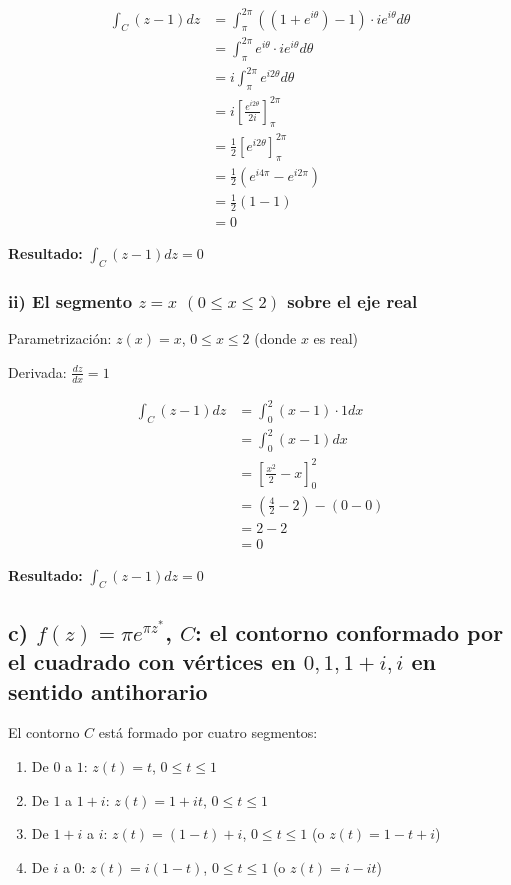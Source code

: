 \documentclass{article}
\begin{document}
\begin{align*}
\int_C (z - 1) dz &= \int_{\pi}^{2\pi} ((1 + e^{i\theta}) - 1) \cdot ie^{i\theta} d\theta \\
                  &= \int_{\pi}^{2\pi} e^{i\theta} \cdot ie^{i\theta} d\theta \\
                  &= i \int_{\pi}^{2\pi} e^{i2\theta} d\theta \\
                  &= i \left[\frac{e^{i2\theta}}{2i}\right]_{\pi}^{2\pi} \\
                  &= \frac{1}{2} \left[e^{i2\theta}\right]_{\pi}^{2\pi} \\
                  &= \frac{1}{2} (e^{i4\pi} - e^{i2\pi}) \\
                  &= \frac{1}{2} (1 - 1) \\
                  &= 0
\end{align*}

\textbf{Resultado:} $\int_C (z - 1) dz = 0$

\subsubsection*{ii) El segmento $z = x$ $(0 \leq x \leq 2)$ sobre el eje real}

Parametrización: $z(x) = x$, $0 \leq x \leq 2$ (donde $x$ es real)

Derivada: $\frac{dz}{dx} = 1$

\begin{align*}
\int_C (z - 1) dz &= \int_0^2 (x - 1) \cdot 1 dx \\
                  &= \int_0^2 (x - 1) dx \\
                  &= \left[\frac{x^2}{2} - x\right]_0^2 \\
                  &= \left(\frac{4}{2} - 2\right) - (0 - 0) \\
                  &= 2 - 2 \\
                  &= 0
\end{align*}

\textbf{Resultado:} $\int_C (z - 1) dz = 0$

\subsection*{c) $f(z) = \pi e^{\pi z^*}$, $C$: el contorno conformado por el cuadrado con vértices en $0, 1, 1 + i, i$ en sentido antihorario}

El contorno $C$ está formado por cuatro segmentos:
\begin{enumerate}
\item De $0$ a $1$: $z(t) = t$, $0 \leq t \leq 1$
\item De $1$ a $1 + i$: $z(t) = 1 + it$, $0 \leq t \leq 1$
\item De $1 + i$ a $i$: $z(t) = (1 - t) + i$, $0 \leq t \leq 1$ (o $z(t) = 1 - t + i$)
\item De $i$ a $0$: $z(t) = i(1 - t)$, $0 \leq t \leq 1$ (o $z(t) = i - it$)
\end{enumerate}
\end{document}
